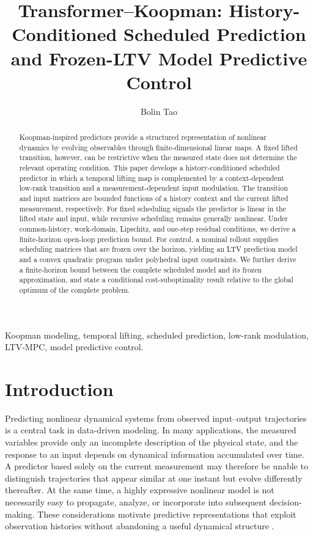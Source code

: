 \documentclass[journal]{IEEEtran}
\begin{document}
\title{Transformer--Koopman: History-Conditioned Scheduled Prediction and Frozen-LTV Model Predictive Control}
\author{Bolin Tao}
\maketitle

\begin{abstract}
Koopman-inspired predictors provide a structured representation of nonlinear dynamics by evolving observables through finite-dimensional linear maps. A fixed lifted transition, however, can be restrictive when the measured state does not determine the relevant operating condition. This paper develops a history-conditioned scheduled predictor in which a temporal lifting map is complemented by a context-dependent low-rank transition and a measurement-dependent input modulation. The transition and input matrices are bounded functions of a history context and the current lifted measurement, respectively. For fixed scheduling signals the predictor is linear in the lifted state and input, while recursive scheduling remains generally nonlinear. Under common-history, work-domain, Lipschitz, and one-step residual conditions, we derive a finite-horizon open-loop prediction bound. For control, a nominal rollout supplies scheduling matrices that are frozen over the horizon, yielding an LTV prediction model and a convex quadratic program under polyhedral input constraints. We further derive a finite-horizon bound between the complete scheduled model and its frozen approximation, and state a conditional cost-suboptimality result relative to the global optimum of the complete problem.
\end{abstract}

\begin{IEEEkeywords}
Koopman modeling, temporal lifting, scheduled prediction, low-rank modulation, LTV-MPC, model predictive control.
\end{IEEEkeywords}

\section{Introduction}
\label{sec:introduction}

Predicting nonlinear dynamical systems from observed input--output trajectories is a central task in data-driven modeling. In many applications, the measured variables provide only an incomplete description of the physical state, and the response to an input depends on dynamical information accumulated over time. A predictor based solely on the current measurement may therefore be unable to distinguish trajectories that appear similar at one instant but evolve differently thereafter. At the same time, a highly expressive nonlinear model is not necessarily easy to propagate, analyze, or incorporate into subsequent decision-making. These considerations motivate predictive representations that exploit observation histories without abandoning a useful dynamical structure \cite{ljung1999system,nelles2020nonlinear,forgione2021dynonet}.
\end{document}
